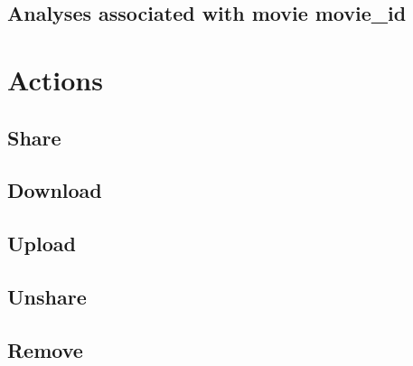 \subsection{Analyses associated with movie movie\_id}
\section{Actions}
\subsection{Share}
\subsection{Download}
\subsection{Upload}
\subsection{Unshare}
\subsection{Remove}

